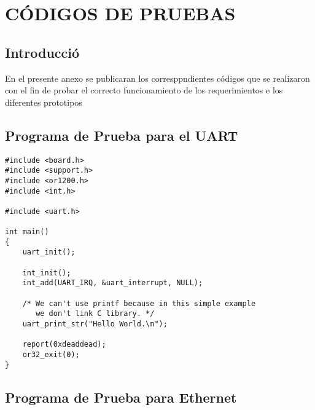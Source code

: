 
\chapter{CÓDIGOS DE PRUEBAS}

 \section{Introducció}

En el presente anexo se  publicaran los corresppndientes códigos que se realizaron con el fin de probar el correcto funcionamiento de los requerimientos e los diferentes prototipos


 \section{Programa de Prueba para el UART}

\begin{verbatim}
#include <board.h>
#include <support.h>
#include <or1200.h>
#include <int.h>

#include <uart.h>

int main()
{
	uart_init();

	int_init();
	int_add(UART_IRQ, &uart_interrupt, NULL);
	
	/* We can't use printf because in this simple example
	   we don't link C library. */
	uart_print_str("Hello World.\n");
	
	report(0xdeaddead);
	or32_exit(0);
}

\end{verbatim}

 \section{Programa de Prueba para Ethernet}

